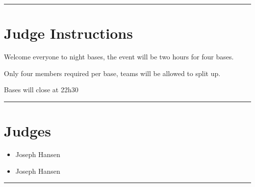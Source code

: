 \documentclass[10pt]{article}
\begin{document}
	\vspace{0.5cm}
	\hrule
	\vspace{0.5cm}

		\section*{Judge Instructions}
		Welcome everyone to night bases, the event will be two hours for four bases.

Only four members required per base, teams will be allowed to split up.

Bases will close at 22h30
\vspace{0.5cm}
	\hrule
	\vspace{0.5cm}
		\section*{\faUsers \: Judges}

		

	\begin{multicols}{2}

		\begin{itemize}
									\item Joseph Hansen
						\end{itemize}

		\vfill\null
		\columnbreak

		\begin{itemize}
									\item Joseph Hansen
						\end{itemize}

		\vfill\null

		\end{multicols}



			\vspace{0.5cm}
	\hrule
	\vspace{0.5cm}
\end{document}
